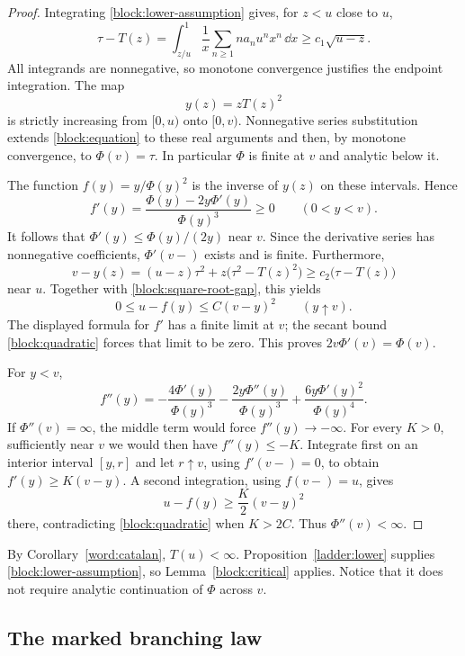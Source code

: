 \begin{proof}
Integrating \eqref{block:lower-assumption} gives, for $z<u$ close to $u$,
\begin{equation}\label{block:square-root-gap}
 \tau-T(z)
 =\int_{z/u}^{1}\frac1x
        \sum_{n\ge1}na_nu^nx^n\,\dd x
 \ge c_1\sqrt{u-z}.
\end{equation}
All integrands are nonnegative, so monotone convergence justifies the
endpoint integration. The map
\[
 y(z)=zT(z)^2
\]
is strictly increasing from $[0,u)$ onto $[0,v)$. Nonnegative series
substitution extends \eqref{block:equation} to these real arguments and
then, by monotone convergence, to $\Phi(v)=\tau$. In particular $\Phi$
is finite at $v$ and analytic below it.

The function $f(y)=y/\Phi(y)^2$ is the inverse of $y(z)$ on these
intervals. Hence
\[
 f'(y)=\frac{\Phi(y)-2y\Phi'(y)}{\Phi(y)^3}\ge0
 \qquad(0<y<v).
\]
It follows that $\Phi'(y)\le\Phi(y)/(2y)$ near $v$. Since the derivative
series has nonnegative coefficients, $\Phi'(v-)$ exists and is finite.
Furthermore,
\[
 v-y(z)=(u-z)\tau^2+z\big(\tau^2-T(z)^2\big)
       \ge c_2\big(\tau-T(z)\big)
\]
near $u$. Together with \eqref{block:square-root-gap}, this yields
\begin{equation}\label{block:quadratic}
 0\le u-f(y)\le C(v-y)^2\qquad(y\uparrow v).
\end{equation}
The displayed formula for $f'$ has a finite limit at $v$; the secant
bound \eqref{block:quadratic} forces that limit to be zero. This proves
$2v\Phi'(v)=\Phi(v)$.

For $y<v$,
\[
 f''(y)
  =-\frac{4\Phi'(y)}{\Phi(y)^3}
   -\frac{2y\Phi''(y)}{\Phi(y)^3}
   +\frac{6y\Phi'(y)^2}{\Phi(y)^4}.
\]
If $\Phi''(v)=\infty$, the middle term would force $f''(y)\to-\infty$.
For every $K>0$, sufficiently near $v$ we would then have
$f''(y)\le-K$. Integrate first on an interior interval $[y,r]$
and let $r\uparrow v$, using $f'(v-)=0$, to obtain
$f'(y)\ge K(v-y)$. A second integration, using $f(v-)=u$, gives
\[
 u-f(y)\ge\frac K2(v-y)^2
\]
there, contradicting \eqref{block:quadratic} when $K>2C$. Thus
$\Phi''(v)<\infty$.
\end{proof}

By Corollary~\ref{word:catalan}, $T(u)<\infty$.
Proposition~\ref{ladder:lower} supplies \eqref{block:lower-assumption},
so Lemma~\ref{block:critical} applies. Notice that it does not require
analytic continuation of $\Phi$ across $v$.

\subsection{The marked branching law}


